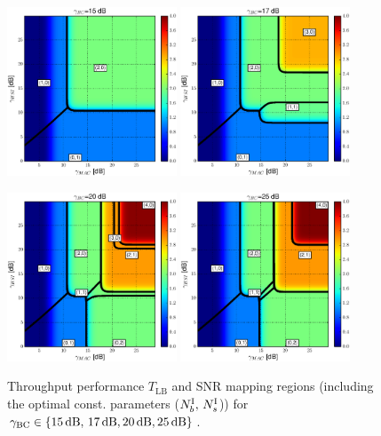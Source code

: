 \documentclass{article}
\begin{document}
\begin{figure}
\begin{centering}
\includegraphics[width=0.45\textwidth]{fig/XOR_map_Througput_BC15}
\quad
\includegraphics[width=0.45\textwidth]{fig/XOR_map_Througput_BC17}
\par\end{centering}

\centering{}
\includegraphics[width=0.45\textwidth]{fig/XOR_map_Througput_BC20}
\quad
\includegraphics[width=0.45\textwidth]{fig/XOR_map_Througput_BC25}
\caption{Throughput performance $T_{\mathrm{LB}}$ and SNR mapping regions
(including the optimal const. parameters ($N_{b}^{{\rm I}},\,N_{s}^{{\rm I}}$))
for $\gamma_{{\rm {BC}}}\in\{15\,\mathrm{dB},\,17\,\mathrm{dB},20\,\mathrm{dB},25\,\mathrm{dB}\}$.\label{fig:CTUpp_SNR_map_BC15-17-20-25}}
\end{figure}
\end{document}
